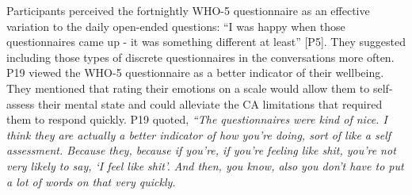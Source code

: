       
        Participants perceived the fortnightly \ac{WHO-5} questionnaire as an effective variation to the daily open-ended questions: ``I was happy when those questionnaires came up - it was something different at least'' [P5]. 
        They suggested including those types of discrete questionnaires in the conversations more often. 
		P19 viewed the \ac{WHO-5} questionnaire as a better indicator of their wellbeing.
		They mentioned that rating their emotions on a scale would allow them to self-assess their mental state and could alleviate the \ac{CA} limitations that required them to respond quickly. P19 quoted, 
        \textit{``The questionnaires were kind of nice. I think they are actually a better indicator of how you're doing, sort of like a self assessment. Because they, because if you're, if you're feeling like shit, you're not very likely to say, `I feel like shit'. And then, you know, also you don't have to put a lot of words on that very quickly. }
